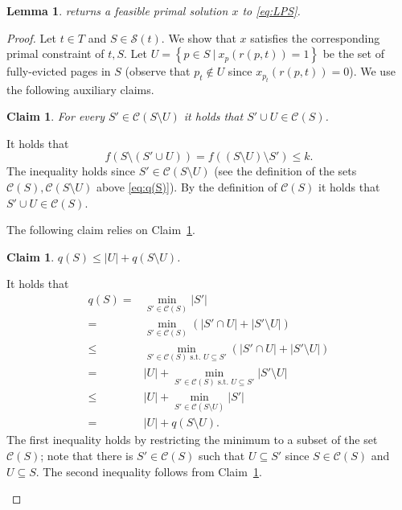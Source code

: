 \documentclass[11pt]{article}
\newcommand{\cC}{{\mathcal{C}}}
\newcommand{\cS}{{\mathcal{S}}}
\newtheorem{lemma}[thm]{Lemma}
\newtheorem{claim}[thm]{Claim}
\begin{document}
	\begin{lemma}
	\label{lem:PFeasibleS}
	 returns a feasible primal solution $x$ to \eqref{eq:LPS}. 
\end{lemma}

\begin{proof}
	Let $t \in T$ and $S \in \cS(t)$. We show that $x$ satisfies the corresponding primal constraint of $t,S$. Let $U = \left\{p \in S~|~x_p(r(p,t)) = 1\right\}$ be the set of fully-evicted pages in $S$ (observe that $p_t \notin U$ since $x_{p_t}(r(p,t)) = 0$). We use the following auxiliary claims. 
	
		\begin{claim}
		\label{claim:r<44}
		For every $S' \in \cC(S \setminus U)$ it holds that $S' \cup U \in \cC(S)$.
	\end{claim}
	\begin{claimproof}
		It holds that 
		$$f \left(S \setminus \left(S' \cup U\right)\right) = f \left((S \setminus U) \setminus S'\right) \leq k.$$
		The inequality holds since $S' \in \cC(S \setminus U)$ (see the definition of the sets $\cC(S),\cC(S \setminus U)$ above \eqref{eq:q(S)}). By the definition of $\cC(S)$ it holds that $S' \cup U \in \cC(S)$.
	\end{claimproof}
	The following claim relies on Claim~\ref{claim:r<44}. 
		\begin{claim}
		\label{claim:r<45}
	$q(S) \leq |U|+q(S \setminus U)$. 
	\end{claim}
	\begin{claimproof}
		It holds that 
		\begin{equation*}
			\begin{aligned}
			q(S) ={} & \min_{S' \in \cC(S)} |S'| 
			\\={} & \min_{S' \in \cC(S)} \left( |S' \cap U|+|S' \setminus U| \right) 
			\\\leq{} &  
			\min_{S' \in \cC(S) \text{ s.t. } U \subseteq S'} \left( |S' \cap U|+|S' \setminus U| \right) 
				\\={} &  
				|U|+\min_{S' \in \cC(S) \text{ s.t. } U \subseteq S'}|S' \setminus U| 
					\\\leq{} &  
				|U|+\min_{S' \in \cC(S \setminus U)} |S'| 
					\\={} &  
				|U|+q(S \setminus U). 
			\end{aligned}
		\end{equation*} The first inequality holds by restricting the minimum to a subset of the set $\cC(S)$; note that there is $S' \in \cC(S)$ such that $U \subseteq S'$ since $S \in \cC(S)$ and $U \subseteq S$. The second inequality follows from Claim~\ref{claim:r<44}. 
	\end{claimproof}
	

\end{proof}
\end{document}
